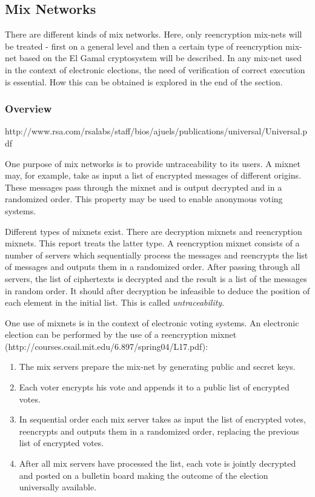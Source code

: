 \subsection{Mix Networks}

There are different kinds of mix networks. Here, only reencryption
mix-nets will be treated - first on a general level and then a certain
type of reencryption mix-net based on the El Gamal cryptosystem will
be described. In any mix-net used in the context of electronic
elections, the need of verification of correct execution is
essential. How this can be obtained is explored in the end of the
section.

\subsubsection{Overview}
http://www.rsa.com/rsalabs/staff/bios/ajuels/publications/universal/Universal.pdf

One purpose of mix networks is to provide untraceability
to its users. A mixnet may, for example, take as input a list of
encrypted messages of different origins. These messages pass through
the mixnet and is output decrypted and in a randomized order. This
property may be used to enable anonymous voting systems.

Different types of mixnets exist. There are decryption mixnets and
reencryption mixnets. This report treats the latter type. A
reencryption mixnet consists of a number of servers which sequentially
process the messages and reencrypts the list of messages and outputs
them in a randomized order. After passing through all servers, the
list of ciphertexts is decrypted and the result is a list of the
messages in random order. It should after decryption be infeasible to
deduce the position of each element in the initial list. This is
called \emph{untraceability}.

One use of mixnets is in the context of electronic voting systems. An
electronic election can be performed by the use of a reencryption
mixnet \\
(http://courses.csail.mit.edu/6.897/spring04/L17.pdf):
\begin{enumerate}
\item The mix servers prepare the mix-net by generating public and
  secret keys.
\item Each voter encrypts his vote and appends it to a public list of
  encrypted votes.
\item In sequential order each mix server takes as input the list of
  encrypted votes, reencrypts and outputs them in a randomized order,
  replacing the previous list of encrypted votes.
\item After all mix servers have processed the list, each vote is
  jointly decrypted and posted on a bulletin board making the outcome
  of the election universally available.
\end{enumerate}

